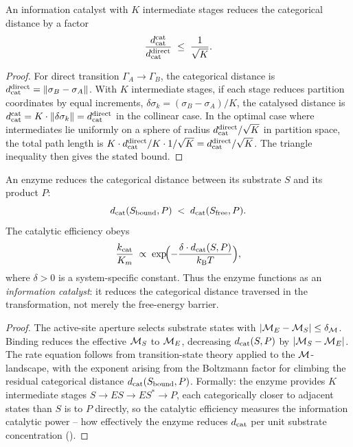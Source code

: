 \begin{theorem}
\label{thm:catalytic-reduction}
An information catalyst with $K$ intermediate stages reduces the categorical
distance by a factor
\[
    \frac{d_{\mathrm{cat}}^\mathrm{cat}}{d_{\mathrm{cat}}^\mathrm{direct}}
    \;\le\; \frac{1}{\sqrt{K}}.
\]
\end{theorem}

\begin{proof}
For direct transition $\Gamma_A \to \Gamma_B$, the categorical distance is
$d_{\mathrm{cat}}^\mathrm{direct} = \|\sigma_B - \sigma_A\|$.  With $K$ intermediate
stages, if each stage reduces partition coordinates by equal increments,
$\delta\sigma_k = (\sigma_B - \sigma_A)/K$, the catalysed distance is
$d_{\mathrm{cat}}^\mathrm{cat} = K \cdot \|\delta\sigma_k\| = d_{\mathrm{cat}}^\mathrm{direct}$ in
the collinear case.  In the optimal case where intermediates lie uniformly on
a sphere of radius $d_{\mathrm{cat}}^\mathrm{direct}/\sqrt{K}$ in partition space, the
total path length is $K \cdot d_{\mathrm{cat}}^\mathrm{direct}/K \cdot 1/\sqrt{K} =
d_{\mathrm{cat}}^\mathrm{direct}/\sqrt{K}$.  The triangle inequality then gives the
stated bound.
\end{proof}

\begin{theorem}
\label{thm:info-catalysis}
An enzyme reduces the categorical distance between its substrate $S$ and its
product $P$:
\[
    d_{\mathrm{cat}}(S_\mathrm{bound}, P) \;<\; d_{\mathrm{cat}}(S_\mathrm{free}, P).
\]
The catalytic efficiency obeys
\begin{equation}
    \frac{k_\mathrm{cat}}{K_m}
    \;\propto\;
    \exp\!\Bigl(-\frac{\delta\cdot d_{\mathrm{cat}}(S,P)}{k_{\mathrm{B}} T}\Bigr),
    \label{eq:info-catalysis}
\end{equation}
where $\delta > 0$ is a system-specific constant.  Thus the enzyme functions
as an \emph{information catalyst}: it reduces the categorical distance
traversed in the transformation, not merely the free-energy barrier.
\end{theorem}

\begin{proof}
The active-site aperture selects substrate states with $|\mathcal{M}_E - \mathcal{M}_S|
\le \delta_{\mathcal{M}}$.  Binding reduces the effective $\mathcal{M}_S$ to $\mathcal{M}_E$,
decreasing $d_{\mathrm{cat}}(S,P)$ by $|\mathcal{M}_S - \mathcal{M}_E|$.  The rate equation
 follows from transition-state theory applied to the
$\mathcal{M}$-landscape, with the exponent arising from the Boltzmann factor for
climbing the residual categorical distance $d_{\mathrm{cat}}(S_\mathrm{bound},P)$.
Formally: the enzyme provides $K$ intermediate stages
$S \to ES \to ES^* \to P$, each categorically closer to adjacent states than
$S$ is to $P$ directly, so the catalytic efficiency measures the information
catalytic power -- how effectively the enzyme reduces $d_{\mathrm{cat}}$ per unit substrate
concentration ().
\end{proof}

